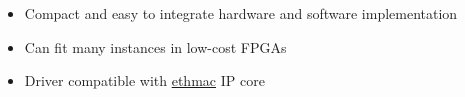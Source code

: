 %

\begin{itemize}
  \itemsep-0.5em
\item Compact and easy to integrate hardware and software implementation
\item Can fit many instances in low-cost FPGAs
\item Driver compatible with \href{https://opencores.org/projects/ethmac}{ethmac} IP core
\end{itemize}
